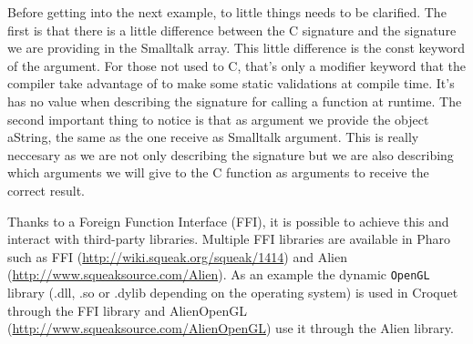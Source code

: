 \documentclass[a4paper,10pt,twoside]{book}
\begin{document}
Before getting into the next example, to little things
needs to be clarified. The first is that there is a little
difference between the C signature and the signature we are
providing in the Smalltalk array. This little difference is 
the const keyword of the argument. For those not used to C, 
that's only a modifier keyword that the compiler take advantage
of to make some static validations at compile time. It's has no
value when describing the signature for calling a function at
runtime.
The second important thing to notice is that as argument we provide
the object aString, the same as the one receive as Smalltalk argument.
This is really neccesary as we are not only describing the signature
but we are also describing which arguments we will give to the C 
function as arguments to receive the correct result. 

% 
% 
% 



Thanks to a Foreign Function Interface (FFI), it is possible to achieve this and interact with third-party libraries.
Multiple FFI libraries are available in Pharo such as FFI (\url{http://wiki.squeak.org/squeak/1414}) and Alien (\url{http://www.squeaksource.com/Alien}).
As an example the dynamic \texttt{OpenGL} library (.dll, .so or .dylib depending on the operating system) is used in Croquet through the FFI library and AlienOpenGL (\url{http://www.squeaksource.com/AlienOpenGL}) use it through the Alien library.
\end{document}
